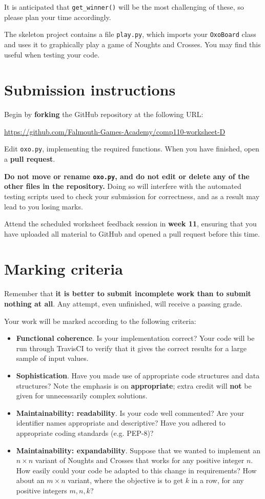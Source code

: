 \documentclass{../../../fal_assignment}
\begin{document}
It is anticipated that \lstinline{get_winner()} will be the most challenging of these,
so please plan your time accordingly.

The skeleton project contains a file \texttt{play.py}, which imports your \lstinline{OxoBoard} class
and uses it to graphically play a game of Noughts and Crosses. You may find this useful when testing your code.

\section*{Submission instructions}

Begin by \textbf{forking} the GitHub repository at the following URL:

\url{https://github.com/Falmouth-Games-Academy/comp110-worksheet-D}

Edit \texttt{oxo.py}, implementing the required functions.
When you have finished, open a \textbf{pull request}.

\textbf{Do not move or rename \texttt{oxo.py}, and do not edit or delete any of the other files in the repository.}
Doing so will interfere with the automated testing scripts used to check your submission for correctness,
and as a result may lead to you losing marks.

Attend the scheduled worksheet feedback session in \textbf{week 11},
ensuring that you have uploaded all material to GitHub and opened a pull request before this time.

\section*{Marking criteria}

Remember that \textbf{it is better to submit incomplete work than to submit nothing at all}.
Any attempt, even unfinished, will receive a passing grade.

Your work will be marked according to the following criteria:
\begin{itemize}
	\item \textbf{Functional coherence}. Is your implementation correct?
		Your code will be run through TravisCI to verify that it gives the correct results for a large sample of input values.
	\item \textbf{Sophistication}. Have you made use of appropriate code structures and data structures?
		Note the emphasis is on \textbf{appropriate}; extra credit will \textbf{not} be given for unnecessarily complex solutions.
	\item \textbf{Maintainability: readability}. Is your code well commented? Are your identifier names appropriate and descriptive?
		Have you adhered to appropriate coding standards (e.g. PEP-8)?
	\item \textbf{Maintainability: expandability}. Suppose that we wanted to implement an $n \times n$ variant of Noughts and Crosses
		that works for any positive integer $n$.
		How easily could your code be adapted to this change in requirements?
		How about an $m \times n$ variant, where the objective is to get $k$ in a row,
		for any positive integers $m,n,k$?
\end{itemize}
\end{document}
